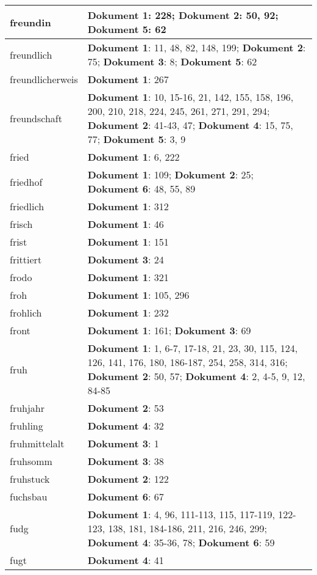 \documentclass[a5paper]{article}
\begin{document}
\begin{longtable}[l]{|l|p{3in}|}
\hline
freundin & \textbf{Dokument 1}: 228; \textbf{Dokument 2}: 50, 92; \textbf{Dokument 5}: 62 \\
\hline
freundlich & \textbf{Dokument 1}: 11, 48, 82, 148, 199; \textbf{Dokument 2}: 75; \textbf{Dokument 3}: 8; \textbf{Dokument 5}: 62 \\
\hline
freundlicherweis & \textbf{Dokument 1}: 267 \\
\hline
freundschaft & \textbf{Dokument 1}: 10, 15-16, 21, 142, 155, 158, 196, 200, 210, 218, 224, 245, 261, 271, 291, 294; \textbf{Dokument 2}: 41-43, 47; \textbf{Dokument 4}: 15, 75, 77; \textbf{Dokument 5}: 3, 9 \\
\hline
fried & \textbf{Dokument 1}: 6, 222 \\
\hline
friedhof & \textbf{Dokument 1}: 109; \textbf{Dokument 2}: 25; \textbf{Dokument 6}: 48, 55, 89 \\
\hline
friedlich & \textbf{Dokument 1}: 312 \\
\hline
frisch & \textbf{Dokument 1}: 46 \\
\hline
frist & \textbf{Dokument 1}: 151 \\
\hline
frittiert & \textbf{Dokument 3}: 24 \\
\hline
frodo & \textbf{Dokument 1}: 321 \\
\hline
froh & \textbf{Dokument 1}: 105, 296 \\
\hline
frohlich & \textbf{Dokument 1}: 232 \\
\hline
front & \textbf{Dokument 1}: 161; \textbf{Dokument 3}: 69 \\
\hline
fruh & \textbf{Dokument 1}: 1, 6-7, 17-18, 21, 23, 30, 115, 124, 126, 141, 176, 180, 186-187, 254, 258, 314, 316; \textbf{Dokument 2}: 50, 57; \textbf{Dokument 4}: 2, 4-5, 9, 12, 84-85 \\
\hline
fruhjahr & \textbf{Dokument 2}: 53 \\
\hline
fruhling & \textbf{Dokument 4}: 32 \\
\hline
fruhmittelalt & \textbf{Dokument 3}: 1 \\
\hline
fruhsomm & \textbf{Dokument 3}: 38 \\
\hline
fruhstuck & \textbf{Dokument 2}: 122 \\
\hline
fuchsbau & \textbf{Dokument 6}: 67 \\
\hline
fudg & \textbf{Dokument 1}: 4, 96, 111-113, 115, 117-119, 122-123, 138, 181, 184-186, 211, 216, 246, 299; \textbf{Dokument 4}: 35-36, 78; \textbf{Dokument 6}: 59 \\
\hline
fugt & \textbf{Dokument 4}: 41 \\

\end{longtable}
\end{document}
